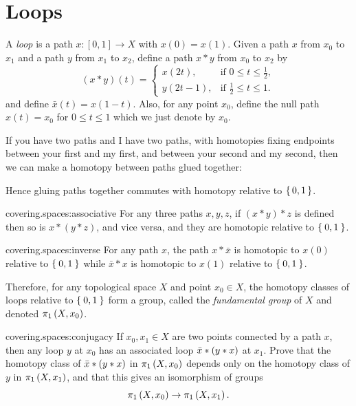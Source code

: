 \section{Loops}
A \emph{loop} is a path \(x \colon [0,1] \to X\) with \(x(0)=x(1)\).
Given a path \(x\) from \(x_0\) to \(x_1\) and a path \(y\) from \(x_1\) to \(x_2\), define a path \(x*y\) from \(x_0\) to \(x_2\) by
\[
(x*y)(t) =
\begin{cases}
x(2t), & \text{if \(0 \le t\le \frac{1}{2}\)}, \\
y(2t-1), & \text{if \(\frac{1}{2} \le t\le 1\)}.
\end{cases}
\]
and define \(\bar{x}(t)=x(1-t)\).
Also, for any point \(x_0\), define the null path \(x(t)=x_0\) for \(0 \le t \le 1\) which we just denote by \(x_0\).

If you have two paths and I have two paths, with homotopies fixing endpoints between your first and my first, and between your second and my second, then we can make a homotopy between paths glued together:
\begin{center}

\end{center}
Hence gluing paths together commutes with homotopy relative to \(\set{0,1}\).
\begin{problem}{covering.spaces:associative}
For any three paths \(x, y, z\), if \((x*y)*z\) is defined then so is \(x*(y*z)\), and vice versa, and they are homotopic relative to \(\Set{0,1}\).
\end{problem}
\begin{problem}{covering.spaces:inverse}
For any path \(x\), the path \(x*\bar{x}\) is homotopic to \(x(0)\)  relative to \(\Set{0,1}\) while \(\bar{x}*x\) is homotopic to \(x(1)\) relative to \(\Set{0,1}\).
\end{problem}
Therefore, for any topological space \(X\) and point \(x_0 \in X\), the homotopy classes of loops relative to \(\Set{0,1}\) form a group, called the \emph{fundamental group} of \(X\) and denoted \(\pi_{1}\left(X,x_0\right)\).

\begin{problem}{covering.spaces:conjugacy}
If \(x_0,x_1 \in X\) are two points connected by a path \(x\), then any loop \(y\) at \(x_0\) has an associated loop \(\bar{x} * \left(y * x\right)\) at \({x_1}\). 
Prove that the homotopy class of \(\bar{x} * \left(y * x\right)\) in \(\pi_{1}\left(X,x_0\right)\) depends only on the homotopy class of \(y\) in \(\pi_{1}\left(X,x_1\right)\), and that this gives an isomorphism of groups
\[
\pi_{1}\left(X,x_0\right) \to \pi_{1}\left(X,x_1\right).
\]
\end{problem}

